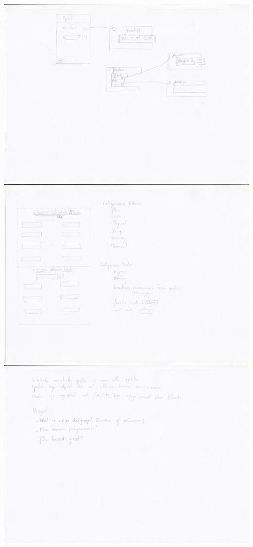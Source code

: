\documentclass[]{article}
\begin{document}
\includegraphics[scale=0.10]{mockup2-2.jpg}
\includegraphics[scale=0.10]{mockup2-4.jpg}
\includegraphics[scale=0.10]{mockup2-3.jpg}
\end{document}
